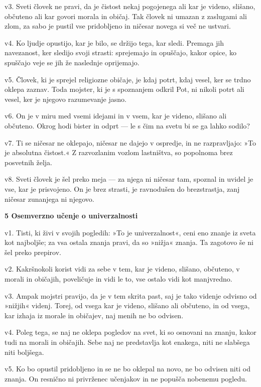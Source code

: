 v3. Sveti človek ne pravi, da je čistost nekaj pogojenega ali kar je videno, slišano, občuteno ali kar govori morala in običaj. Tak človek ni umazan z zaslugami ali zlom, za sabo je pustil vse pridobljeno in ničesar novega si več ne ustvari.

v4. Ko ljudje opustijo, kar je bilo, se držijo tega, kar sledi. Premaga jih navezanost, ker sledijo svoji strasti: sprejemajo in opuščajo, kakor opice, ko spuščajo veje se jih že naslednje oprijemajo.

v5. Človek, ki je sprejel religiozne običaje, je kdaj potrt, kdaj vesel, ker se trdno oklepa zaznav. Toda mojster, ki je s spoznanjem odkril Pot, ni nikoli potrt ali vesel, ker je njegovo razumevanje jasno.

v6. On je v miru med vsemi idejami in v vsem, kar je videno, slišano ali občuteno. Okrog hodi bister in odprt --- le s čim na svetu bi se ga lahko sodilo?

v7. Ti se ničesar ne oklepajo, ničesar ne dajejo v ospredje, in ne razpravljajo: »To je absolutna čistost.« Z razvozlanim vozlom lastništva, so popolnoma brez posvetnih želja.

v8. Sveti človek je šel preko meja --- za njega ni ničesar tam, spoznal in uvidel je vse, kar je prisvojeno. On je brez strasti, je ravnodušen do brezstrastja, zanj ničesar zunanjega ni njegovo.

\textbf{5 Osemverzno učenje o univerzalnosti}

v1. Tisti, ki živi v svojih pogledih: »To je univerzalnost«, ceni eno znanje iz sveta kot najboljše; za vsa ostala znanja pravi, da so »nižja« znanja. Ta zagotovo še ni šel preko prepirov.

v2. Kakršnokoli korist vidi za sebe v tem, kar je videno, slišano, občuteno, v morali in običajih, poveličuje in vidi le to, vse ostalo vidi kot manjvredno.

v3. Ampak mojstri pravijo, da je v tem skrita past, saj je tako videnje odvisno od »nižjih« videnj. Torej, od vsega kar je videno, slišano ali občuteno, in od vsega, kar izhaja iz morale in običajev, naj menih ne bo odvisen.

v4. Poleg tega, se naj ne oklepa pogledov na svet, ki so osnovani na znanju, kakor tudi na morali in običajih. Sebe naj ne predstavlja kot enakega, niti ne slabšega niti boljšega.

v5. Ko bo opustil pridobljeno in se ne bo oklepal na novo, ne bo odvisen niti od znanja. On resnično ni privrženec učenjakov in ne popušča nobenemu pogledu.

